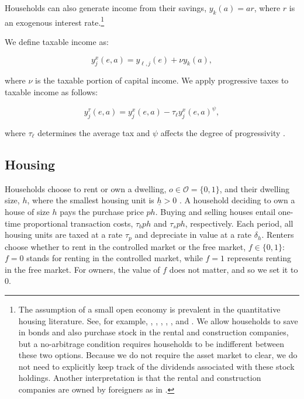 \documentclass[parskip=full]{article}
\begin{document}
Households can also generate income from their savings, $y_{k}(a)=ar$, where $r$ is an exogenous interest rate.\footnote{The assumption of a small open economy is prevalent in the quantitative housing literature. See, for example, \citet{sommeretal-2013}, \citet{arslanetal-2015}, \citet{floettotetal-2016}, \cite{sommersullivan-2017}, \citet{kaplanetal-2019}, and \citet{kkk-2021}. We allow households to save in bonds and also purchase stock in the rental and construction companies, but a no-arbitrage condition requires households to be indifferent between these two options. Because we do not require the asset market to clear, we do not need to explicitly keep track of the dividends associated with these stock holdings. Another interpretation is that the rental and construction companies are owned by foreigners as in \citet{floettotetal-2016}.}

We define taxable income as:

\begin{equation*}\label{eq:taxable_labor_income}
  y^{x}_{j}(e,a) =y_{\ell,j}(e)+\nu y_{k}(a),
\end{equation*}

\noindent where $\nu$ is the taxable portion of capital income. We apply progressive taxes to taxable income as follows:

\begin{equation}\label{eq:income_tax}
  y^{\tau}_{j}(e,a) = y^{x}_{j}(e,a)-\tau_{\ell}y^{x}_{j}(e,a)^{\psi},
\end{equation}

\noindent where $\tau_{\ell}$ determines the average tax and $\psi$ affects the degree of progressivity \citep{hsv-2020}.

\subsection{Housing}\label{subsection:housing_choice}

Households choose to rent or own a dwelling, $o \in \mathcal{O}=\{0,1\}$, and their dwelling size, $h$, where the smallest housing unit is $\underline{h}>0$ \citep{gervais,sommeretal-2013,sommersullivan-2017,kaplanetal-2019}. A household deciding to own a house of size $h$ pays the purchase price $p h$. Buying and selling houses entail one-time proportional transaction costs, $\tau_{b} p h$ and $\tau_{s} p h$, respectively. Each period, all housing units are taxed at a rate $\tau_{p}$ and depreciate in value at a rate $\delta_h$. Renters choose whether to rent in the controlled market or the free market, $f \in \{0,1\}$: $f=0$ stands for renting in the controlled market, while $f=1$ represents renting in the free market. For owners, the value of $f$ does not matter, and so we set it to $0$.  
\end{document}

